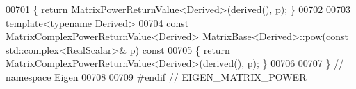 \begin{DoxyCode}
00701 \textcolor{keyword}{}\{ \textcolor{keywordflow}{return} \hyperlink{class_eigen_1_1_matrix_power_return_value}{MatrixPowerReturnValue<Derived>}(derived(), p); \}
00702 
00703 \textcolor{keyword}{template}<\textcolor{keyword}{typename} Derived>
00704 \textcolor{keyword}{const} \hyperlink{class_eigen_1_1_matrix_complex_power_return_value}{MatrixComplexPowerReturnValue<Derived>} 
      \hyperlink{group___core___module_class_eigen_1_1_matrix_base}{MatrixBase<Derived>::pow}(\textcolor{keyword}{const} std::complex<RealScalar>& p)\textcolor{keyword}{ const}
00705 \textcolor{keyword}{}\{ \textcolor{keywordflow}{return} \hyperlink{class_eigen_1_1_matrix_complex_power_return_value}{MatrixComplexPowerReturnValue<Derived>}(derived(), p); \}
00706 
00707 \} \textcolor{comment}{// namespace Eigen}
00708 
00709 \textcolor{preprocessor}{#endif // EIGEN\_MATRIX\_POWER}
\end{DoxyCode}
